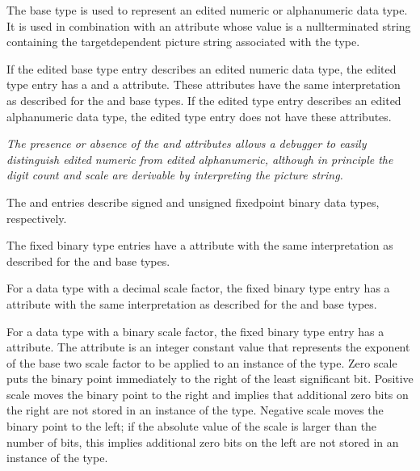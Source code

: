 The  base type is used to represent an edited
numeric or alphanumeric data type. It is used in combination
with an  attribute whose value is a 
null\dash terminated string containing the target\dash dependent picture
string associated with the type.

If the edited base type entry describes an edited numeric
data type, the edited type entry has a  and a
 attribute. These attributes have the same
interpretation as described for the  and
 base types. If the edited type entry
describes an edited alphanumeric data type, the edited type
entry does not have these attributes.


\textit{The presence or absence of the  and
 attributes allows a debugger to easily
distinguish edited numeric from edited alphanumeric, although
in principle the digit count and scale are derivable by
interpreting the picture string.}

The  and  entries
describe signed and unsigned fixed\dash point binary data types,
respectively.

The fixed binary type entries have a 
attribute with the same interpretation as described for the
 and  base types.

For a data type with a decimal scale factor, the fixed binary
type entry has a  attribute with the same
interpretation as described for the 
and  base types.

For a data type with a binary scale factor, the fixed
binary type entry has a  attribute. The
 attribute is an integer constant value
that represents the exponent of the base two scale factor to
be applied to an instance of the type.  Zero scale puts the
binary point immediately to the right of the least significant
bit. Positive scale moves the binary point to the right and
implies that additional zero bits on the right are not stored
in an instance of the type. Negative scale moves the binary
point to the left; if the absolute value of the scale is
larger than the number of bits, this implies additional zero
bits on the left are not stored in an instance of the type.

